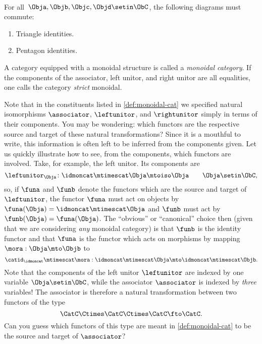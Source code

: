 \begin{ctdefinition}
    \condit\\
    For all~$\Obja,\Objb,\Objc,\Objd\setin \ObC$, the following diagrams must commute:
    \begin{enumerate}
        \item Triangle identities.
        \item Pentagon identities.\\
    \end{enumerate}
    A category equipped with a monoidal structure is called a \emph{monoidal category}.
    If the components of the associator, left unitor, and right unitor are all equalities, one calls the category \emph{strict} monoidal.
\end{ctdefinition}

\begin{remark}
    Note that in the constituents listed in \cref{def:monoidal-cat} we specified natural isomorphisms $\associator$, $\leftunitor$, and $\rightunitor$ simply in terms of their components.
    You may be wondering: which functors are the respective source and target of these natural transformations?
    Since it is a mouthful to write, this information is often left to be inferred from the components given.
    Let us quickly illustrate how to see, from the components, which functors are involved.
    Take, for example, the left unitor.
    Its components are
    \begin{equation}
        \leftunitor_\Obja \colon \idmoncat\mtimescat \Obja \mtoiso \Obja \quad \quad \Obja\setin \ObC,
    \end{equation}
    so, if $\funa$ and $\funb$ denote the functors which are the source and target of $\leftunitor$, the functor $\funa$ must act on objects by $\funa(\Obja) = \idmoncat \mtimescat \Obja$ and $\funb$ must act by $\funb(\Obja) = \funa(\Obja)$.
    The ``obvious'' or ``canonical'' choice then (given that we are considering \emph{any} monoidal category) is that $\funb$ is the identity functor and that $\funa$ is the functor which acts on morphisms by mapping $\mora : \Obja \mto \Objb$ to
    \begin{equation}
        \catid_\idmoncat \mtimescat \mora:   \idmoncat\mtimescat \Obja \mto  \idmoncat\mtimescat \Objb.
    \end{equation}
    Note that the components of the left unitor $\leftunitor$ are indexed by one variable $\Obja \setin \ObC$, while the associator $\associator$ is indexed by \emph{three} variables!
    The associator is therefore a natural transformation between two functors of the type
    \begin{equation}
        \CatC \Ctimes \CatC \Ctimes \CatC \fto \CatC.
    \end{equation}
    Can you guess which functors of this type are meant in \cref{def:monoidal-cat} to be the source and target of $\associator$?
\end{remark}

